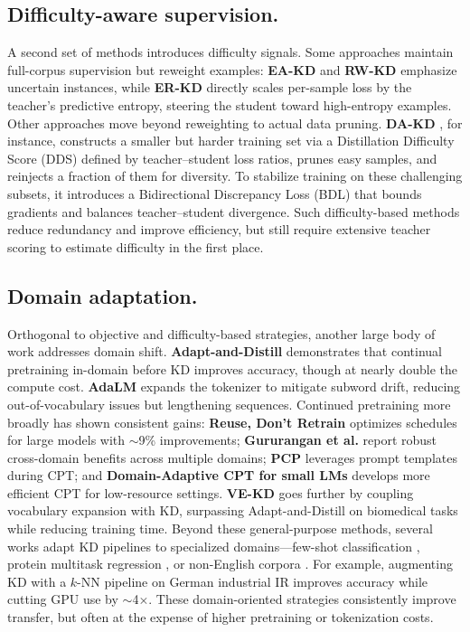 \subsection{Difficulty-aware supervision.}
A second set of methods introduces difficulty signals. Some approaches maintain full-corpus supervision but reweight examples: \textbf{EA-KD} \cite{eakd} and \textbf{RW-KD} \cite{rwkd} emphasize uncertain instances, while \textbf{ER-KD} \cite{erkd} directly scales per-sample loss by the teacher’s predictive entropy, steering the student toward high-entropy examples. Other approaches move beyond reweighting to actual data pruning. \textbf{DA-KD} \cite{dakd}, for instance, constructs a smaller but harder training set via a Distillation Difficulty Score (DDS) defined by teacher–student loss ratios, prunes easy samples, and reinjects a fraction of them for diversity. To stabilize training on these challenging subsets, it introduces a Bidirectional Discrepancy Loss (BDL) that bounds gradients and balances teacher–student divergence. Such difficulty-based methods reduce redundancy and improve efficiency, but still require extensive teacher scoring to estimate difficulty in the first place.

\subsection{Domain adaptation.}
Orthogonal to objective and difficulty-based strategies, another large body of work addresses domain shift. \textbf{Adapt-and-Distill} \cite{adaptanddistill} demonstrates that continual pretraining in-domain before KD improves accuracy, though at nearly double the compute cost. \textbf{AdaLM} expands the tokenizer to mitigate subword drift, reducing out-of-vocabulary issues but lengthening sequences. Continued pretraining more broadly has shown consistent gains: \textbf{Reuse, Don’t Retrain} \cite{reuse2024} optimizes schedules for large models with $\sim$9\% improvements; \textbf{Gururangan et al.} \cite{gururangan2020don} report robust cross-domain benefits across multiple domains; \textbf{PCP} \cite{pcp2023} leverages prompt templates during CPT; and \textbf{Domain-Adaptive CPT for small LMs} \cite{domainadaptive2025} develops more efficient CPT for low-resource settings. \textbf{VE-KD} \cite{vekd2024} goes further by coupling vocabulary expansion with KD, surpassing Adapt-and-Distill on biomedical tasks while reducing training time. Beyond these general-purpose methods, several works adapt KD pipelines to specialized domains—few-shot classification \cite{adasent2023}, protein multitask regression \cite{selfprot2024}, or non-English corpora \cite{germanprocess2023}. For example, augmenting KD with a $k$-NN pipeline on German industrial IR improves accuracy while cutting GPU use by $\sim$4$\times$. These domain-oriented strategies consistently improve transfer, but often at the expense of higher pretraining or tokenization costs.

